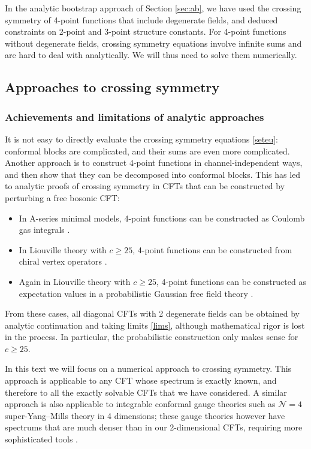 \documentclass[12pt, a4paper]{article}
\begin{document}
In the analytic bootstrap approach of Section \ref{sec:ab}, we have used the crossing symmetry of 4-point functions that include degenerate fields, and deduced constraints on 2-point and 3-point structure constants. For 4-point functions without degenerate fields, crossing symmetry equations involve infinite sums and are hard to deal with analytically. We will thus need to solve them numerically. 

\subsection{Approaches to crossing symmetry}

\subsubsection{Achievements and limitations of analytic approaches}

It is not easy to directly evaluate the crossing symmetry equations \eqref{seteu}: conformal blocks are complicated, and their sums are even more complicated. Another approach is to construct 4-point functions in channel-independent ways, and then show that they can be decomposed into conformal blocks. This has led to analytic proofs of crossing symmetry in CFTs that can be constructed by perturbing a free bosonic CFT:
\begin{itemize}
 \item In A-series minimal models, 4-point functions can be constructed as Coulomb gas integrals \cite{df84}.
 \item In Liouville theory with $c\geq 25$, 4-point functions can be constructed from chiral vertex operators \cite{tes03b}.
 \item Again in Liouville theory with $c\geq 25$, 4-point functions can be constructed as expectation values in a probabilistic Gaussian free field theory \cite{ckrv05}. 
\end{itemize}
From these cases, all diagonal CFTs with 2 degenerate fields can be obtained by analytic continuation and taking limits \eqref{lims}, although mathematical rigor is lost in the process. In particular, the probabilistic construction only makes sense for $c\geq 25$. 

In this text we will focus on a numerical approach to crossing symmetry. This approach is applicable to any CFT whose spectrum is exactly known, and therefore to all the exactly solvable CFTs that we have considered. 
A similar approach is also applicable to integrable conformal gauge theories such as $\mathcal{N}=4$ super-Yang--Mills theory in 4 dimensions; these gauge theories however have spectrums that are much denser than in our 2-dimensional CFTs, requiring more sophisticated tools \cite{cgjp22}.
\end{document}
